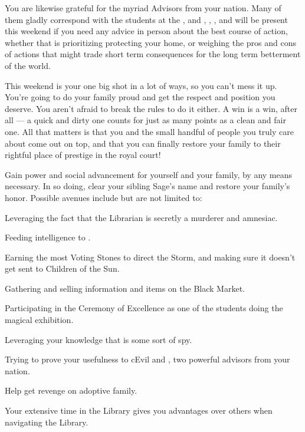 \documentclass[char]{GL2020}
\begin{document}
You are likewise grateful for the myriad Advisors from your nation. Many of them gladly correspond with the students at the \pSchool{}, and \cEvil{\full}, \cWildCard{\full}, \cHedonist{\full}, and \cCurse{\full} will be present this weekend if you need any advice in person about the best course of action, whether that is prioritizing protecting your home, or weighing the pros and cons of actions that might trade short term consequences for the long term betterment of the world.

This weekend is your one big shot in a lot of ways, so you can't mess it up. You're going to do your family proud and get the respect and position you deserve. You aren't afraid to break the rules to do it either. A win is a win, after all — a quick and dirty one counts for just as many points as a clean and fair one. All that matters is that you and the small handful of people you truly care about come out on top, and that you can finally restore your family to their rightful place of prestige in the royal court! 

\begin{itemz}
    \item Gain power and social advancement for yourself and your family, by any means necessary. In so doing, clear your sibling Sage’s name and restore your family’s honor. Possible avenues include but are not limited to:
        \item Leveraging the fact that the Librarian is secretly a murderer and amnesiac.
        \item Feeding intelligence to \cHistory{}.
        \item Earning the most Voting Stones to direct the Storm, and making sure it doesn't get sent to Children of the Sun.
        \item Gathering and selling information and items on the Black Market.
        \item Participating in the Ceremony of Excellence as one of the students doing the magical exhibition.
        \item Leveraging your knowledge that \cInterpol{} is some sort of spy.
        \item Trying to prove your usefulness to cEvil{} and \cHedonist{}, two powerful advisors from your nation.
    \item Help \cAdopted{} get revenge on \cAdopted{\their} adoptive family.
   \end{itemz}

\begin{itemz}[Notes]
    \item Your extensive time in the Library gives you advantages over others when navigating the Library.
\end{itemz}
\end{document}
